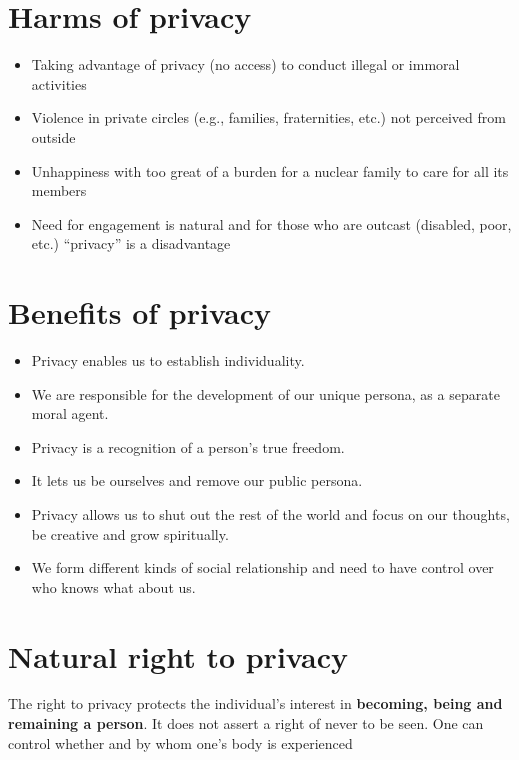 \documentclass{article}
\begin{document}
\tableofcontents

\newpage

\section{Harms of privacy}
\begin{itemize}
  \item Taking advantage of privacy (no access) to conduct illegal or immoral activities
  \item Violence in private circles (e.g., families, fraternities, etc.) not perceived from outside
  \item Unhappiness with too great of a burden for a nuclear family to care for all its members
  \item Need for engagement is natural and for those who are outcast (disabled, poor, etc.) “privacy” is a disadvantage
\end{itemize}

\section{Benefits of privacy}
\begin{itemize}
  \item Privacy enables us to establish individuality.
  \item We are responsible for the development of our unique persona, as a separate moral agent.
  \item Privacy is a recognition of a person’s true freedom.
  \item It lets us be ourselves and remove our public persona.
  \item Privacy allows us to shut out the rest of the world and focus on our thoughts, be creative and grow spiritually.
  \item We form different kinds of social relationship and need to have control over who knows what about us.
\end{itemize}

\section{Natural right to privacy}
\begin{flushleft}
The right to privacy protects the individual’s interest in \textbf{becoming, being and remaining a person}. It does not assert a right of never to be seen. One can control whether and by whom one’s body is experienced
\end{flushleft}
\end{document}
